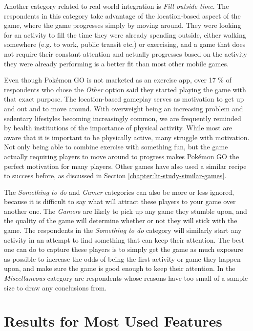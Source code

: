 Another category related to real world integration is \emph{Fill outside time}. The respondents in this category take advantage of the location-based aspect of the game, where the game progresses simply by moving around. They were looking for an activity to fill the time they were already spending outside, either walking somewhere (e.g. to work, public transit etc.) or exercising, and a game that does not require their constant attention and actually progresses based on the activity they were already performing is a better fit than most other mobile games.

Even though Pokémon GO is not marketed as an exercise app, over 17 \% of respondents who chose the \emph{Other} option said they started playing the game with that exact purpose. The location-based gameplay serves as motivation to get up and out and to move around. With overweight being an increasing problem and sedentary lifestyles becoming increasingly common, we are frequently reminded by health institutions of the importance of physical activity. While most are aware that it is important to be physically active, many struggle with motivation. Not only being able to combine exercise with something fun, but the game actually requiring players to move around to progress makes Pokémon GO the perfect motivation for many players. Other games have also used a similar recipe to success before, as discussed in Section \ref{chapter:lit-study-similar-games}.

The \emph{Something to do} and \emph{Gamer} categories can also be more or less ignored, because it is difficult to say what will attract these players to your game over another one. The \emph{Gamer}s are likely to pick up any game they stumble upon, and the quality of the game will determine whether or not they will stick with the game. The respondents in the \emph{Something to do} category will similarly start any activity in an attempt to find something that can keep their attention. The best one can do to capture these players is to simply get the game as much exposure as possible to increase the odds of being the first activity or game they happen upon, and make sure the game is good enough to keep their attention. In the \emph{Miscellaneous} category are respondents whose reasons have too small of a sample size to draw any conclusions from.


\section{Results for Most Used Features}
\label{sec:success-factors-features}

